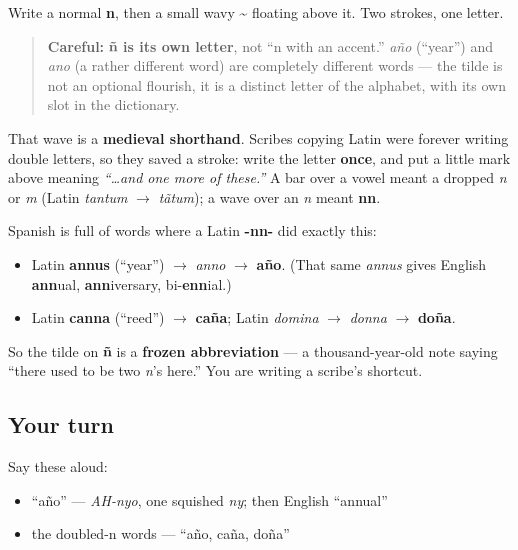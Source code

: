Write a normal \textbf{n}, then a small wavy \textbf{\textasciitilde{}} floating above it. Two strokes, one letter.

\begin{quote}
\textbf{Careful:} \textbf{ñ is its own letter}, not \textquotedblleft{}n with an accent.\textquotedblright{} \emph{año} (\textquotedblleft{}year\textquotedblright{}) and \emph{ano} (a rather different word) are completely different words — the tilde is not an optional flourish, it is a distinct letter of the alphabet, with its own slot in the dictionary.
\end{quote}

\begin{culture}
That wave is a \textbf{medieval shorthand}. Scribes copying Latin were forever writing double letters, so they saved a stroke: write the letter \textbf{once}, and put a little mark above meaning \emph{\textquotedblleft{}…and one more of these.\textquotedblright{}} A bar over a vowel meant a dropped \emph{n} or \emph{m} (Latin \emph{tantum} $\to$ \emph{tãtum}); a wave over an \emph{n} meant \textbf{nn}.

Spanish is full of words where a Latin \textbf{-nn-} did exactly this:

\begin{itemize}
\raggedright
  \item Latin \textbf{annus} (\textquotedblleft{}year\textquotedblright{}) $\to$ \emph{anno} $\to$ \textbf{año}. (That same \emph{annus} gives English \textbf{ann}ual, \textbf{ann}iversary, bi-\textbf{enn}ial.)
  \item Latin \textbf{canna} (\textquotedblleft{}reed\textquotedblright{}) $\to$ \textbf{caña}; Latin \emph{domina} $\to$ \emph{donna} $\to$ \textbf{doña}.
\end{itemize}

So the tilde on \textbf{ñ} is a \textbf{frozen abbreviation} — a thousand-year-old note saying \textquotedblleft{}there used to be two \emph{n}'s here.\textquotedblright{} You are writing a scribe's shortcut.
\end{culture}

\subsection*{Your turn}
Say these aloud:

\begin{itemize}
\raggedright
  \item \textquotedblleft{}año\textquotedblright{} — \emph{AH-nyo}, one squished \emph{ny}; then English \textquotedblleft{}annual\textquotedblright{}
  \item the doubled-n words — \textquotedblleft{}año, caña, doña\textquotedblright{}
\end{itemize}

